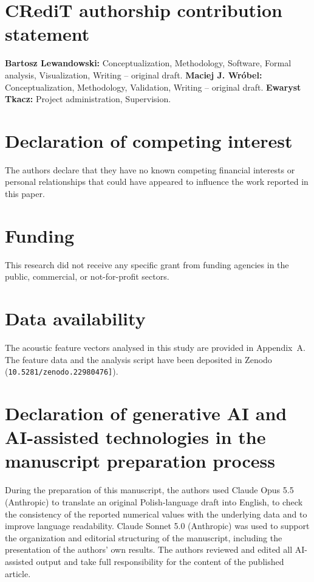 
\section*{CRediT authorship contribution statement}
\textbf{Bartosz Lewandowski:} Conceptualization, Methodology, Software, Formal analysis, Visualization, Writing – original draft.
\textbf{Maciej J. Wróbel:} Conceptualization, Methodology, Validation, Writing – original draft.
\textbf{Ewaryst Tkacz:} Project administration, Supervision.

\section*{Declaration of competing interest}
The authors declare that they have no known competing financial interests or personal relationships that could have appeared to influence the work reported in this paper.

\section*{Funding}
This research did not receive any specific grant from funding agencies in the public, commercial, or not-for-profit sectors.

\section*{Data availability}
The acoustic feature vectors analysed in this study are provided in Appendix~A. The feature data and the analysis script have been deposited in  Zenodo (\texttt{10.5281/zenodo.22980476]}).

\section*{Declaration of generative AI and AI-assisted technologies in the manuscript preparation process}

During the preparation of this manuscript, the authors used Claude Opus 5.5 (Anthropic) to translate an original Polish-language draft into English, to check the consistency of the reported numerical values with the underlying data and to improve language readability. Claude Sonnet 5.0 (Anthropic) was used to support the organization and editorial structuring of the manuscript, including the presentation of the authors' own results. The authors reviewed and edited all AI-assisted output and take full responsibility for the content of the published article.
